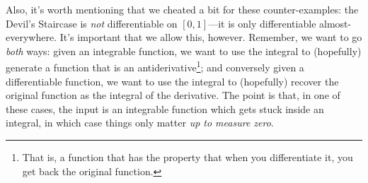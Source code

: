 Also, it's worth mentioning that we cheated a bit for these counter-examples:  the Devil's Staircase is \emph{not} differentiable on $[0,1]$---it is only differentiable almost-everywhere.  It's important that we allow this, however.  Remember, we want to go \emph{both} ways:  given an integrable function, we want to use the integral to (hopefully) generate a function that is an antiderivative\footnote{That is, a function that has the property that when you differentiate it, you get back the original function.}; and conversely given a differentiable function, we want to use the integral to (hopefully) recover the original function as the integral of the derivative.  The point is that, in one of these cases, the input is an integrable function which gets stuck inside an integral, in which case things only matter \emph{up to measure zero}.

